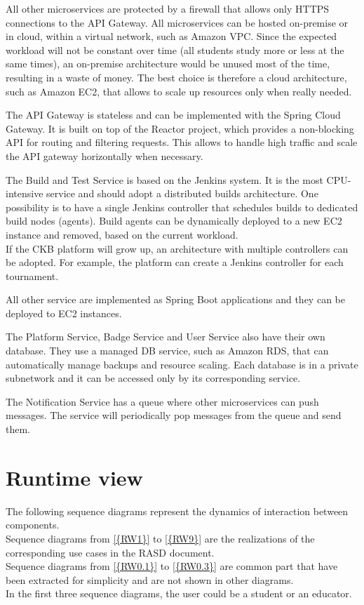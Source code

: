 All other microservices are protected by a firewall that allows only HTTPS connections to the API Gateway.
All microservices can be hosted on-premise or in cloud, within a virtual network, such as Amazon VPC.
Since the expected workload will not be constant over time (all students study more or less at the same times),
an on-premise architecture would be unused most of the time, resulting in a waste of money.
The best choice is therefore a cloud architecture, such as Amazon EC2, that allows to scale up resources only when really needed.

The API Gateway is stateless and can be implemented with the Spring Cloud Gateway. 
It is built on top of the Reactor project, which provides a non-blocking API for routing and filtering requests.
This allows to handle high traffic and scale the API gateway horizontally when necessary.

The Build and Test Service is based on the Jenkins system.
It is the most CPU-intensive service and should adopt a distributed builds architecture.
One possibility is to have a single Jenkins controller that schedules builds to dedicated build nodes (agents).
Build agents can be dynamically deployed to a new EC2 instance and removed, based on the current workload.\\
If the CKB platform will grow up, an architecture with multiple controllers can be adopted.
For example, the platform can create a Jenkins controller for each tournament.

All other service are implemented as Spring Boot applications and they can be deployed to EC2 instances.

The Platform Service, Badge Service and User Service also have their own database.
They use a managed DB service, such as Amazon RDS, that can automatically manage backups and resource scaling.
Each database is in a private subnetwork and it can be accessed only by its corresponding service.

The Notification Service has a queue  where other microservices can push messages. 
The service will periodically pop messages from the queue and send them.

\pagebreak

\section{Runtime view}
The following sequence diagrams represent the dynamics of interaction between components.\\
Sequence diagrams from \ref{{RW1}} to \ref{{RW9}} are the realizations of the corresponding use cases in the RASD document.\\
Sequence diagrams from \ref{{RW0.1}} to \ref{{RW0.3}} are common part that have been extracted for simplicity and are not shown in other diagrams.\\
In the first three sequence diagrams, the user could be a student or an educator.

